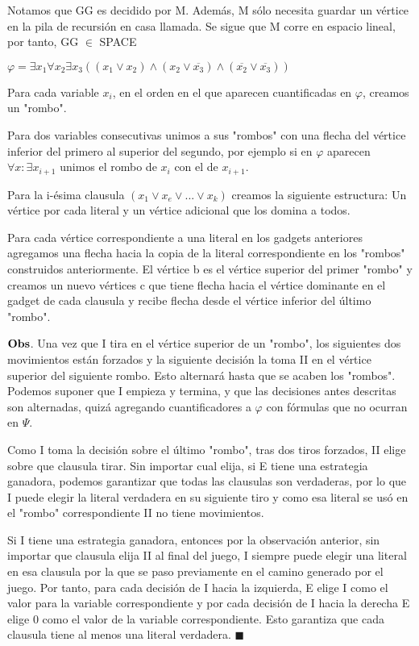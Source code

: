 \documentclass{homework}
\begin{document}
Notamos que GG es decidido por M. Además, M sólo necesita guardar un vértice en la pila de recursión en casa llamada. Se sigue que M corre en espacio lineal, por tanto, GG $\in$ SPACE

$\varphi = \exists x_1\forall x_2 \exists x_3 ((x_1 \vee x_2) \wedge (x_2 \vee \overline{x_3}) \wedge (\overline{x_2} \vee \overline{x_3}))$

Para cada variable $x_i$, en el orden en el que aparecen cuantificadas en $\varphi$, creamos un "rombo".

Para dos variables consecutivas unimos a sus "rombos" con una flecha del vértice inferior del primero al superior del segundo, por ejemplo si en $\varphi$ aparecen $\forall x: \exists x_{i+1} $ unimos el rombo de $x_i$ con el de $x_{i+1}$.

Para la i-ésima clausula $(x_1 \vee x_e \vee ... \vee x_k )$ creamos la siguiente estructura: Un vértice por cada literal y un vértice adicional que los domina a todos.

Para cada vértice correspondiente a una literal en los gadgets anteriores agregamos una flecha hacia la copia de la literal correspondiente en los "rombos" construidos anteriormente. El vértice b es el vértice superior del primer "rombo" y creamos un nuevo vértices c que tiene flecha hacia el vértice dominante en el gadget de cada clausula y recibe flecha desde el vértice inferior del último "rombo".

$\bf{Obs}$. Una vez que I tira en el vértice superior de un "rombo", los siguientes dos movimientos están forzados y la siguiente decisión la toma II en el vértice superior del siguiente rombo. Esto alternará hasta que se acaben los "rombos".
Podemos suponer que I empieza y termina, y que las decisiones antes descritas son alternadas, quizá agregando cuantificadores a $\varphi$ con fórmulas que no ocurran en $\varPsi$.

Como I toma la decisión sobre el último "rombo", tras dos tiros forzados, II elige sobre que clausula tirar. Sin importar cual elija, si E tiene una estrategia ganadora, podemos garantizar que todas las clausulas son verdaderas, por lo que I puede elegir la literal verdadera en su siguiente tiro y como esa literal se usó en el "rombo" correspondiente II no tiene movimientos.

Si I tiene una estrategia ganadora, entonces por la observación anterior, sin importar que clausula elija II al final del juego, I siempre puede elegir una literal en esa clausula por la que se paso previamente en el camino generado por el juego. Por tanto, para cada decisión de I hacia la izquierda, E elige I como el valor para la variable correspondiente y por cada decisión de I hacia la derecha E elige 0 como el valor de la variable correspondiente. Esto garantiza que cada clausula tiene al menos una literal verdadera. $\blacksquare$ 
\end{document}
